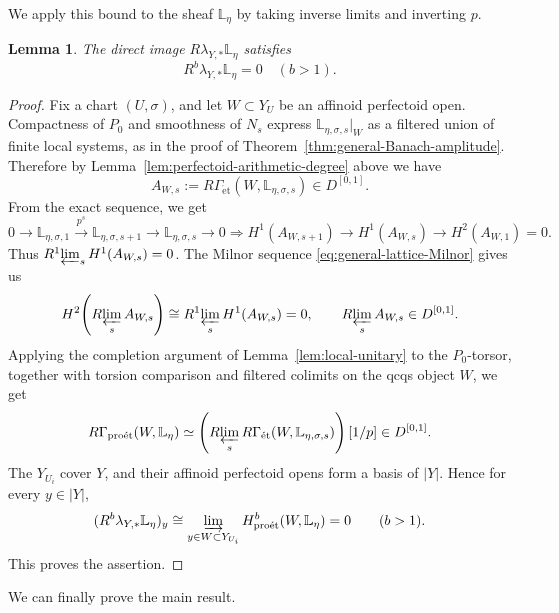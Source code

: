 \documentclass[11pt]{article}
\newtheorem{lemma}[theorem]{Lemma}
\theoremstyle{definition}
\newcommand{\proet}{\mathrm{pro\acute et}}
\newcommand{\et}{\mathrm{\acute et}}
\begin{document}
We apply this bound to the sheaf $\mathbb{L}_\eta$ by taking inverse limits and inverting $p$.
\begin{lemma}
\label{lem:parabolic-arithmetic-pushforward}
The direct image $R\lambda_{Y,*}\mathbb L_\eta$ satisfies
\[
 R^b\lambda_{Y,*}\mathbb L_\eta=0\quad(b>1).
\]
\end{lemma}
\begin{proof}
Fix a chart \((U,\sigma)\), and let \(W\subset Y_U\) be an
affinoid perfectoid open.  Compactness of \(P_0\) and smoothness
of \(N_s\) express \(\mathbb L_{\eta,\sigma,s}|_W\) as a
filtered union of finite local systems, as in the proof of
Theorem~\ref{thm:general-Banach-amplitude}. Therefore by 
Lemma~\ref{lem:perfectoid-arithmetic-degree} above we have
\begin{equation*}
 A_{W,s}:=R\Gamma_{\et}(W,\mathbb L_{\eta,\sigma,s})
 \in D^{[0,1]}.
\end{equation*}
From the exact sequence, we get
\begin{equation*}
 0\longrightarrow\mathbb L_{\eta,\sigma,1}
 \xrightarrow{p^s}\mathbb L_{\eta,\sigma,s+1}
 \longrightarrow\mathbb L_{\eta,\sigma,s}\longrightarrow0
\Rightarrow
 H^1(A_{W,s+1})\longrightarrow H^1(A_{W,s})
 \longrightarrow H^2(A_{W,1})=0.
\end{equation*}
Thus \(R^1\!\varprojlim_s H^1(A_{W,s})=0\).
The Milnor sequence \eqref{eq:general-lattice-Milnor} gives us
\begin{equation*}
 H^2\!\left(R\!\varprojlim_s A_{W,s}\right)
 \cong R^1\!\varprojlim_s H^1(A_{W,s})=0,
 \qquad R\!\varprojlim_s A_{W,s}\in D^{[0,1]}.
\end{equation*}
Applying the completion argument of
Lemma~\ref{lem:local-unitary} to the \(P_0\)-torsor, together with
torsion comparison and filtered colimits on the qcqs object \(W\), we get
\begin{equation*}
 R\Gamma_{\proet}(W,\mathbb L_\eta)
 \simeq\left(R\!\varprojlim_s
 R\Gamma_{\et}(W,\mathbb L_{\eta,\sigma,s})\right)[1/p]
 \in D^{[0,1]}.
\end{equation*}
The \(Y_{U_i}\) cover \(Y\), and their affinoid perfectoid
opens form a basis of \(|Y|\).  Hence for every \(y\in|Y|\),
\begin{equation*}
 (R^b\lambda_{Y,*}\mathbb L_\eta)_y
 \cong\varinjlim_{y\in W\subset Y_{U_i}}
 H^b_{\proet}(W,\mathbb L_\eta)=0\qquad(b>1).
\end{equation*}
This proves the assertion.
\end{proof}

We can finally prove the main result.
\end{document}
